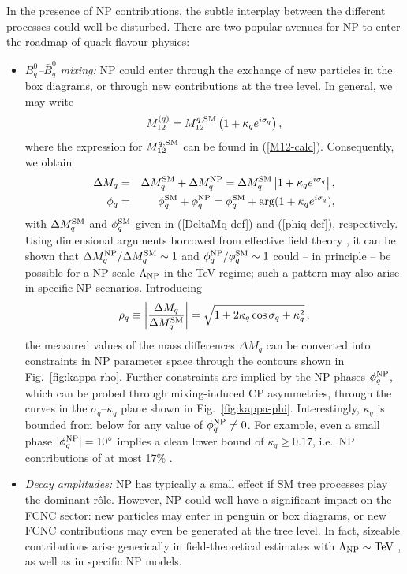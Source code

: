 \documentclass[11pt]{cernrep}
\begin{document}
In the presence of NP contributions, the subtle interplay between the different 
processes could well be disturbed. There are two popular avenues for NP to 
enter the roadmap of quark-flavour physics:
\begin{itemize}
\item {\it $B^0_q$--$\bar B^0_q$ mixing:} NP could enter through the exchange
of new particles in the box diagrams, or through new contributions at the
tree level. In general, we may write
\begin{equation}%
M_{12}^{(q)} =M_{12}^{q,{\rm SM}} \left(1 + \kappa_q e^{i\sigma_q}\right),
\end{equation}
where the expression for $M_{12}^{q,{\rm SM}}$ can be found 
in (\ref{M12-calc}). Consequently, we obtain
\begin{eqnarray}
\Delta M_q & = &\Delta M_q^{\rm SM}+\Delta M_q^{\rm NP} =
\Delta M_q^{\rm SM}\left| 1 + \kappa_q
  e^{i\sigma_q}\right|,\label{DMq-NP}\\
\phi_q & = & \phi_q^{\rm SM}+\phi_q^{\rm NP}=
\phi_q^{\rm SM} + \arg (1+\kappa_q e^{i\sigma_q}),\label{phiq-NP}
\end{eqnarray}
with $\Delta M_q^{\rm SM}$ and $\phi_q^{\rm SM}$ given in (\ref{DeltaMq-def}) and
(\ref{phiq-def}), respectively. 
Using dimensional arguments borrowed from effective field 
theory \cite{FM-BpsiK,FIM}, it can be shown that 
$\Delta M_q^{\rm NP}/\Delta M_q^{\rm SM}\sim1$ and
$\phi_q^{\rm NP}/\phi_q^{\rm SM}\sim1$ could -- in principle -- be possible
for a NP scale $\Lambda_{\rm NP}$ in the TeV regime; such a pattern may 
also arise in specific NP scenarios. Introducing 
\begin{equation}\label{rhoq-def}
\rho_q\equiv
\left|\frac{\Delta M_q}{\Delta M_q^{\rm SM}}\right|=
\sqrt{1+2\kappa_q\cos\sigma_q+\kappa_q^2}\,,
\end{equation}
the measured values of the mass differences $\Delta M_q$ can be converted
into constraints in NP parameter space through the contours shown in
Fig.~\ref{fig:kappa-rho}. Further constraints are implied by the NP
phases $\phi_q^{\rm NP}$, which can be probed through mixing-induced
CP asymmetries, through the curves in the $\sigma_q$--$\kappa_q$
plane shown in Fig.~\ref{fig:kappa-phi}. Interestingly, $\kappa_q$ is bounded
from below for any value of $\phi_q^{\rm NP}\not=0$. For example, even a
small phase $|\phi_q^{\rm NP}|=10^\circ$ implies a clean lower bound of
$\kappa_q\geq0.17$, i.e.\ NP contributions of at most 17\% \cite{BF-DMs}. 
\item {\it Decay amplitudes:} NP has typically a small effect if SM tree processes
play the dominant r\^ole. However, NP could well have a significant impact on 
the FCNC sector: new particles may enter in penguin or box diagrams, or new 
FCNC contributions may even be generated at the tree level. In fact, sizeable 
contributions arise generically in field-theoretical estimates with 
$\Lambda_{\rm NP}\sim\mbox{TeV}$ \cite{FM-BphiK}, as well as in specific 
NP models. 
\end{itemize}
\end{document}
